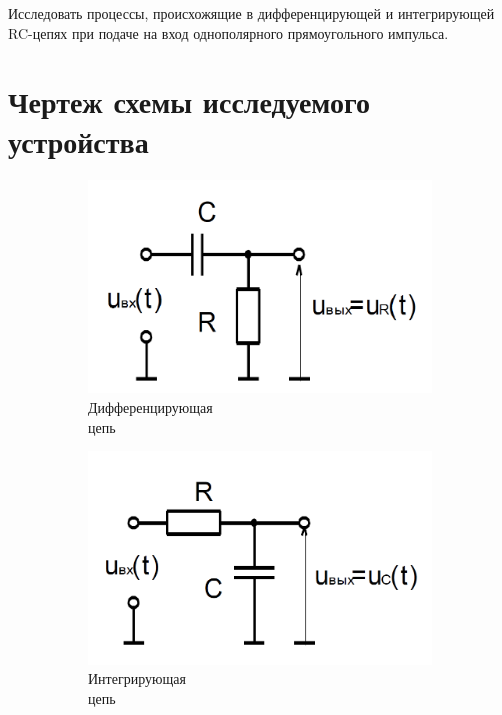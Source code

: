 \documentclass[a4paper,14pt]{extarticle}
\begin{document}
Исследовать процессы, происхожящие в дифференцирующей и интегрирующей RC-цепях при подаче на вход однополярного прямоугольного импульса.

\section{Чертеж схемы исследуемого устройства}

\begin{figure}[H]
\begin{center}
	\begin{subfigure}[b]{0.4\textwidth}
		\includegraphics[scale=0.3]{diff}
		\caption{Дифференцирующая\\ цепь}
	\end{subfigure}
	\begin{subfigure}[b]{0.4\textwidth}
		\includegraphics[scale=0.3]{int}
		\caption{Интегрирующая\\ цепь}
	\end{subfigure}
	\caption{}
\end{center}
\end{figure}
\end{document}
